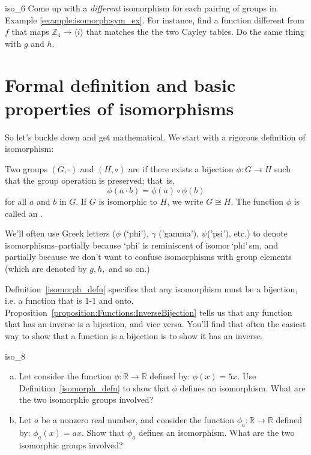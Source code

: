  \begin{exercise}{iso_6}
 Come up with a \emph{different} isomorphism for each pairing of groups in Example \ref{example:isomorph:sym_ex}. For instance, find a  function  different from $f$ that maps ${\mathbb Z_4} \longrightarrow \langle i \rangle$  that matches the the two Cayley tables. Do the same thing with $g$ and $h$.
 \end{exercise}
  
\section{Formal definition and basic properties of isomorphisms}
\label{sec:Isomorphism:FormalDefinition}

So let's buckle down and get mathematical. We start with a rigorous definition of isomorphism:

\begin{defn}\label{isomorph_defn}
Two groups $(G, \cdot)$ and $(H, \circ)$ are  if there exists a bijection $\phi : G \rightarrow H$ such that the group operation is preserved;  that~is, 
\[
\phi( a \cdot b) = \phi( a) \circ \phi( b)
\]
for all $a$ and $b$ in $G$. If $G$ is isomorphic to $H$, we write $G \cong H$. The function $\phi$ is called an . 
\end{defn}

\begin{rem}
We'll often use Greek letters ($\phi$ (`phi'), $\gamma$ ('gamma'), $\psi$('psi'), etc.) to denote isomorphisms--partially because `phi' is reminiscent of isomor$\,$`phi'$\,$sm, and partially because we don't want to confuse isomorphisms with group elements  (which are denoted by $g,h,$ and so on.)
\end{rem}

\begin{rem}
Definition~\ref{isomorph_defn} specifies that any isomorphism must be a bijection, i.e. a function that is 1-1 and onto.  Proposition~\ref{proposition:Functions:InverseBijection} tells us that any function that has an inverse is a bijection, and vice versa. You'll find that often the easiest way to show that a function is a bijection is to show it has an inverse.   
\end{rem}


\begin{exercise}{iso_8}
\begin{enumerate}[(a)]
\item
Let consider the function $\phi : \mathbb{R} \rightarrow \mathbb{R}$ defined by:  $\phi(x) = 5x$.  Use Definition~\ref{isomorph_defn} to show that $\phi$ defines an isomorphism. What are the two isomorphic groups involved?
\item
Let $a$ be a nonzero real number, and consider the function $\phi_a : \mathbb{R} \rightarrow \mathbb{R}$ defined by:  $\phi_a(x) = ax$.  Show that $\phi_a$ defines an isomorphism. What are the two isomorphic groups involved?
\end{enumerate}
\end{exercise}

